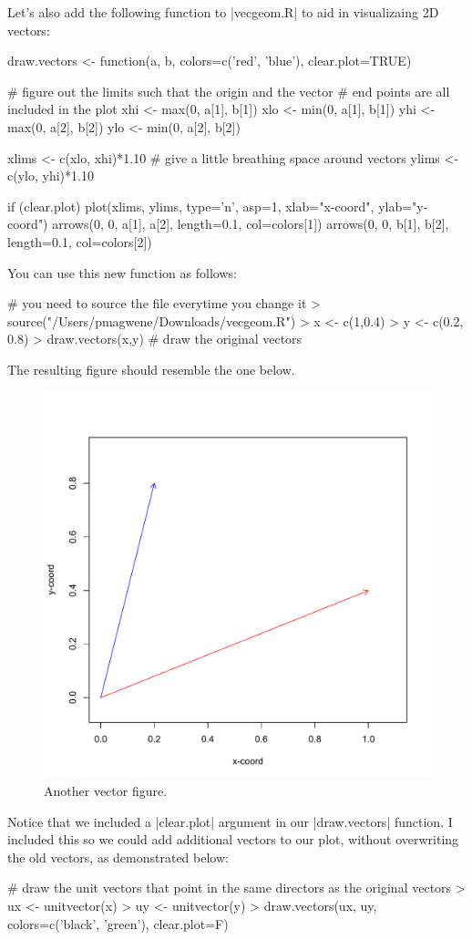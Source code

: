 Let's also add the following function to |vecgeom.R| to aid in visualizaing 2D vectors:
%
\begin{R}
draw.vectors <- function(a, b, colors=c('red', 'blue'), clear.plot=TRUE){

    # figure out the limits such that the origin and the vector
    # end points are all included in the plot
    xhi <- max(0, a[1], b[1])
    xlo <- min(0, a[1], b[1])
    yhi <- max(0, a[2], b[2])
    ylo <- min(0, a[2], b[2])

    xlims <- c(xlo, xhi)*1.10 # give a little breathing space around vectors
    ylims <- c(ylo, yhi)*1.10

    if (clear.plot){
        plot(xlims, ylims, type='n', asp=1, xlab="x-coord", ylab="y-coord")
    }
    arrows(0, 0, a[1], a[2], length=0.1, col=colors[1])
    arrows(0, 0, b[1], b[2], length=0.1, col=colors[2])
}
\end{R}
%
You can use this new function as follows:
\begin{R}
# you need to source the file everytime you change it
> source("/Users/pmagwene/Downloads/vecgeom.R")
> x <- c(1,0.4)
> y <- c(0.2, 0.8)
> draw.vectors(x,y)  # draw the original vectors
\end{R}
%
The resulting figure should resemble the one below.
%
\begin{figure}[htbp]
\centering
\includegraphics[width=0.33\columnwidth]{./figures/hands-on2/vecfig2.pdf}
\caption{Another vector figure.}
\end{figure}

Notice that we included a |clear.plot| argument in our |draw.vectors| function. I included this so we could add additional vectors to our plot, without overwriting the old vectors, as demonstrated below:
\begin{R}
# draw the unit vectors that point in the same directors as the original vectors
> ux <- unitvector(x)
> uy <- unitvector(y)
> draw.vectors(ux, uy, colors=c('black', 'green'), clear.plot=F)
\end{R}

